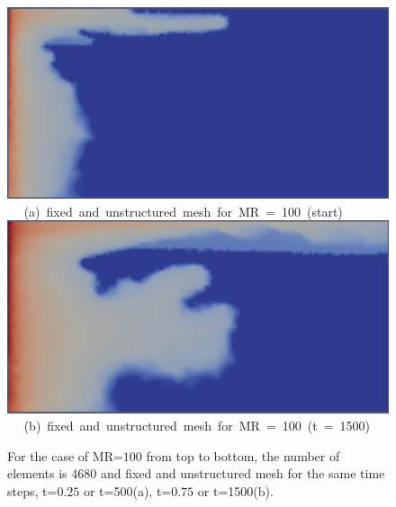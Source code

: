 \begin{landscape}
\begin{figure}[ht] 
\vbox{
\hbox{\hspace{3.5cm}
\includegraphics[width=.8\textwidth]{./Pics1/mr100_fixed/mr100_fixed_500.pdf} 
}
\vspace{0.0cm}
\hbox{\hspace{4.0cm} (a) fixed and unstructured mesh for MR = 100 (start)   
}
\hbox{\hspace{3.5cm}
\includegraphics[width=.8\textwidth]{./Pics1/mr100_fixed/mr100_fixed_1500.pdf}
}
\vspace{0.0cm}
\hbox{\hspace{3.75cm} (b) fixed and unstructured mesh for MR = 100 (t = 1500)   
}
}     
\caption{For the case of MR=$100$ from top to bottom, the number of elements is $4680$ and fixed and unstructured mesh for the same time steps, t=$0.25$ or t=500(a), t=$0.75$ or t=1500(b). }
\label{fig:4testcase_a}
\end{figure}
\end{landscape}
\clearpage

